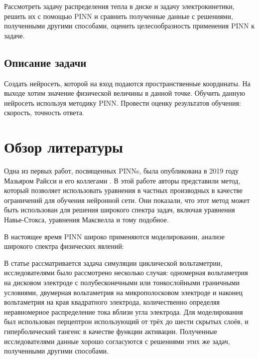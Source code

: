 \documentclass[a4paper,14pt]{extarticle} %
\def\oldcite{} \let\oldcite=\cite
\def\cite{\stepcounter{citesnum}\oldcite}
\begin{document}
Рассмотреть задачу распределения тепла в диске и задачу электрокинетики, решить их с помощью PINN и сравнить полученные данные с решениями, полученными другими способами, оценить целесообразность применения PINN к задаче.

\subsection{Описание задачи}

Создать нейросеть, которой на вход подаются пространственные координаты. На выходе хотим значение физической величины в данной точке. Обучить данную нейросеть используя методику PINN. Провести оценку результатов обучения: скорость, точность ответа.

\section{Обзор литературы}


Одна из первых работ, посвященных PINNs, была опубликована в 2019 году Мазьяром Райсси и его коллегами \cite{bib:pinn:first}. В этой работе авторы представили метод, который позволяет использовать уравнения в частных производных в качестве ограничений для обучения нейронной сети. Они показали, что этот метод может быть использован для решения широкого спектра задач, включая уравнения Навье-Стокса, уравнения Максвелла и тому подобное.

В настоящее время PINN широко применяются моделировании, анализе широкого спектра физических явлений:

В статье \cite{bib:voltogr:1} рассматривается задача симуляции циклической вольтаметрии, исследователями было рассмотрено несколько случая: одномерная вольтаметрия на дисковом электроде с полубесконечными или тонкослойными граничными условиями, двумерная вольтаметрия на микрополосковом электроде и наконец вольтаметрия на края квадратного электрода, количественно определяя неравномерное распределение тока вблизи угла электрода. Для моделирования был использован перцептрон использующий от трёх до шести скрытых слоёв, и гиперболический тангенс в качестве функции активации. Полученные исследователями данные хорошо согласуются с решениями этих же задач, полученными другими способами.
\end{document}
